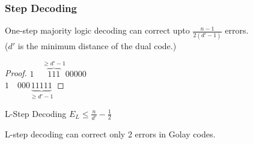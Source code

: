 \message{ !name(1.tex)}\documentclass[xcolor=xvgnames]{beamer}
\begin{document}
\begin{frame}
  \frametitle{Step Decoding}
\begin{Theorem}
One-step majority logic decoding can correct upto $\frac{n-1}{2(d'-1)}$ errors.\\
($d'$ is the minimum distance of the dual code.)
\begin{proof} 
$1 \quad \overbrace{1 1 1}^{\geq d'-1}  0 0 0 0 0 $ \\
$1 \quad 0 0 0  \underbrace{1 1 1 1 1}_{\geq d'-1} $

\end{proof}
\end{Theorem}  

\begin{block}{L-Step Decoding}
$E_L \leq \frac{n}{d'} - \frac{1}{2} $ 




\end{block}

L-step decoding can correct only 2 errors in Golay codes.

\end{frame}

\end{document}
